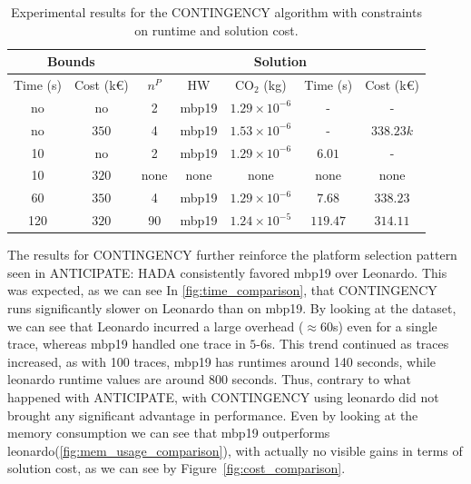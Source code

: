\documentclass[a4paper,singleside,12pt]{report} %
\begin{document}
\begin{table}[h!]
    \centering
    \begin{tabular}{|cc|ccccc|}
        \hline
        \multicolumn{2}{|c|}{Bounds} & \multicolumn{5}{c|}{Solution} \\
        \hline
        Time (s) & Cost (k€) & $n^P$ & HW & CO$_2$ (kg) & Time (s) & Cost (k€) \\
        \hline
        no & no & 2 & mbp19 & $1.29 \times 10^{-6}$ & - & - \\
        no & $350$ & 4 & mbp19 & $1.53 \times 10^{-6}$ & - & $338.23k$ \\
        10 & no & 2 & mbp19 & $1.29 \times 10^{-6}$ & $6.01$ & - \\
        10 & $320$ & none & none & none & none & none \\
        60 & $350$ & 4 & mbp19 & $1.29 \times 10^{-6}$ & $7.68$ & $338.23$ \\
        120 & $320$ & 90 & mbp19 & $1.24 \times 10^{-5}$ & $119.47$ & $314.11$ \\
        \hline
    \end{tabular}
    \caption{Experimental results for the CONTINGENCY algorithm with constraints on runtime and solution cost.}
    \label{tab:contingency_results}
\end{table}

The results for CONTINGENCY further reinforce the platform selection pattern seen in ANTICIPATE: HADA consistently favored mbp19 over Leonardo. This was expected, as we can see In
\ref{fig:time_comparison}, that CONTINGENCY runs significantly slower on Leonardo than on mbp19. By looking at the dataset, we can see that Leonardo incurred a large overhead ($\approx60$s) 
even for a single trace, whereas mbp19 handled one trace in $5$-$6$s. This trend continued as traces increased, as with 100 traces, mbp19 has runtimes around 140 seconds, while leonardo runtime
values are around 800 seconds. Thus, contrary to what happened with ANTICIPATE, with CONTINGENCY using leonardo did not brought any significant advantage in performance. Even by looking at the
memory consumption we can see that mbp19 outperforms leonardo(\ref{fig:mem_usage_comparison}), with actually no visible gains in terms of solution cost, as we can see by Figure~\ref{fig:cost_comparison}. 
\end{document}
